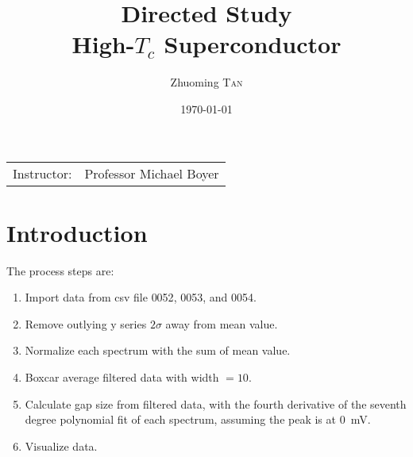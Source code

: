 


\usepackage{pgfplots}
\pgfplotsset{compat=1.11}


\title{Directed Study \\ High-$T_c$ Superconductor} %

\author{Zhuoming \textsc{Tan}} %

\date{\today} %



	\maketitle %

	\begin{center}
		\begin{tabular}{l r}
			Instructor: & Professor Michael Boyer %
		\end{tabular}
	\end{center}


	\section{Introduction} %
	\label{sec:introduction}
	The process steps are:
	\begin{enumerate}
		\item Import data from csv file \textsf{0052}, \textsf{0053}, and \textsf{0054}.
		\item Remove outlying y series $2\sigma$ away from mean value.
		\item Normalize each spectrum with the sum of mean value.
		\item Boxcar average filtered data with width $=10$.
		\item Calculate gap size from filtered data, with the fourth derivative of the seventh degree polynomial fit of each spectrum, assuming the peak is at \SI{0}{\milli\volt}.
		\item Visualize data.
	\end{enumerate}

